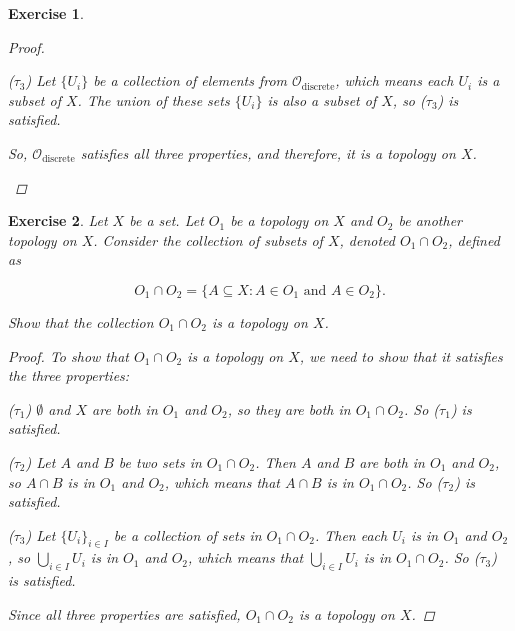 \documentclass{article}
\newtheorem{exercise}{Exercise}
\begin{document}
\begin{exercise}
\begin{proof}
\begin{enumerate}
($\tau_3$) Let $\{U_i\}$ be a collection of elements from $\mathcal{O}_{\text{discrete}}$, which means each $U_i$ is a subset of $X$. The union of these sets $\{U_i\}$ is also a subset of $X$, so ($\tau_3$) is satisfied.

So, $\mathcal{O}_{\text{discrete}}$ satisfies all three properties, and therefore, it is a topology on $X$.
\end{enumerate}

    \end{proof}
\end{exercise}

    \begin{exercise}
        Let $X$ be a set. Let $O_1$ be a topology on $X$ and $O_2$ be another topology on $X$. Consider the collection of subsets of $X$, denoted $O_1 \cap O_2$, defined as

\[
O_1 \cap O_2 = \{A \subseteq X : A \in O_1 \text{ and } A \in O_2\}.
\]

Show that the collection $O_1 \cap O_2$ is a topology on $X$.

    \begin{proof}
        To show that $O_1 \cap O_2$ is a topology on $X$, we need to show that it satisfies the three properties:

($\tau_1$) $\emptyset$ and $X$ are both in $O_1$ and $O_2$, so they are both in $O_1 \cap O_2$. So ($\tau_1$) is satisfied.

($\tau_2$) Let $A$ and $B$ be two sets in $O_1 \cap O_2$. Then $A$ and $B$ are both in $O_1$ and $O_2$, so $A \cap B$ is in $O_1$ and $O_2$, which means that $A \cap B$ is in $O_1 \cap O_2$. So ($\tau_2$) is satisfied.

($\tau_3$) Let $\{U_i\}_{i\in I}$ be a collection of sets in $O_1 \cap O_2$. Then each $U_i$ is in $O_1$ and $O_2$, so $\bigcup_{i\in I} U_i$ is in $O_1$ and $O_2$, which means that $\bigcup_{i\in I} U_i$ is in $O_1 \cap O_2$. So ($\tau_3$) is satisfied.

Since all three properties are satisfied, $O_1 \cap O_2$ is a topology on $X$.
    \end{proof}
    \end{exercise}
\end{document}
